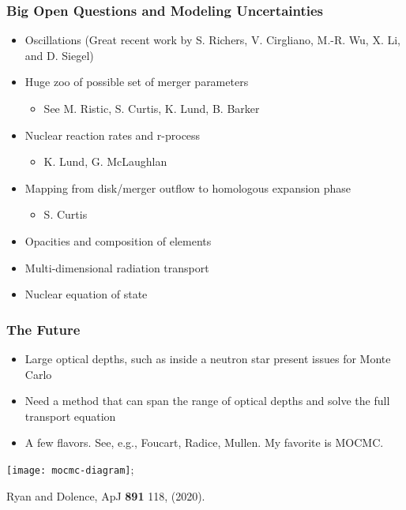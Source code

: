 \documentclass[]{beamer}
\begin{document}
\begin{frame}
  \frametitle{Big Open Questions and Modeling Uncertainties}
  \begin{itemize}
  \item Oscillations (Great recent work by S. Richers, V. Cirgliano, M.-R. Wu, X. Li, and D. Siegel)
  \item Huge zoo of possible set of merger parameters
    \begin{itemize}
    \item See M. Ristic, S. Curtis, K. Lund, B. Barker
    \end{itemize}
  \item Nuclear reaction rates and r-process
    \begin{itemize}
    \item K. Lund, G. McLaughlan
    \end{itemize}
  \item Mapping from disk/merger outflow to homologous expansion phase
    \begin{itemize}
    \item S. Curtis
    \end{itemize}
  \item Opacities and composition of elements
  \item Multi-dimensional radiation transport
  \item Nuclear equation of state
  \end{itemize}
\end{frame}

\begin{frame}
  \frametitle{The Future}
  \begin{itemize}
  \item Large optical depths, such as inside a neutron star present issues for Monte Carlo
  \item Need a method that can span the range of optical depths and solve the full transport equation
  \item A few flavors. See, e.g., Foucart, Radice, Mullen. My favorite is MOCMC.
  \end{itemize}
  \begin{center}
    \texttt{[image: mocmc-diagram]};
  \end{center}
  {\footnotesize Ryan and Dolence, ApJ \textbf{891} 118, (2020).}
\end{frame}
\end{document}
